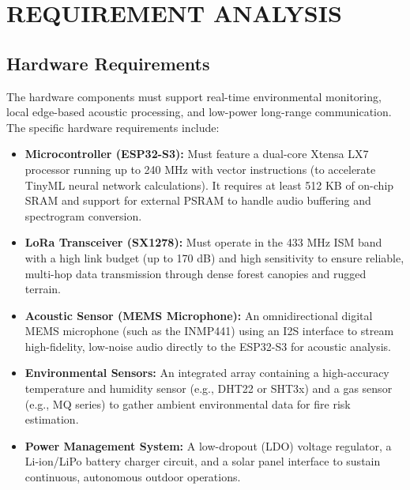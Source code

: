 \chapter{REQUIREMENT ANALYSIS}
\section{Hardware Requirements}
The hardware components must support real-time environmental monitoring, local edge-based acoustic processing, and low-power long-range communication. The specific hardware requirements include:

\begin{itemize}
    \item \textbf{Microcontroller (ESP32-S3):} 
    Must feature a dual-core Xtensa LX7 processor running up to 240 MHz with vector instructions (to accelerate TinyML neural network calculations). It requires at least 512 KB of on-chip SRAM and support for external PSRAM to handle audio buffering and spectrogram conversion.
    
    \item \textbf{LoRa Transceiver (SX1278):} 
    Must operate in the 433 MHz ISM band with a high link budget (up to 170 dB) and high sensitivity to ensure reliable, multi-hop data transmission through dense forest canopies and rugged terrain.
    
    \item \textbf{Acoustic Sensor (MEMS Microphone):} 
    An omnidirectional digital MEMS microphone (such as the INMP441) using an I2S interface to stream high-fidelity, low-noise audio directly to the ESP32-S3 for acoustic analysis.
    
    \item \textbf{Environmental Sensors:} 
    An integrated array containing a high-accuracy temperature and humidity sensor (e.g., DHT22 or SHT3x) and a gas sensor (e.g., MQ series) to gather ambient environmental data for fire risk estimation.
    
    \item \textbf{Power Management System:} 
    A low-dropout (LDO) voltage regulator, a Li-ion/LiPo battery charger circuit, and a solar panel interface to sustain continuous, autonomous outdoor operations.
\end{itemize}

